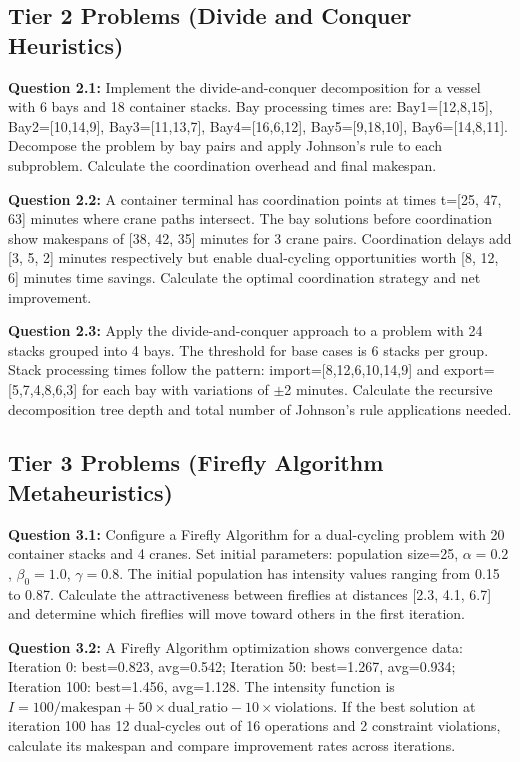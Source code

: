 \documentclass{article}
\begin{document}
\subsection{Tier 2 Problems (Divide and Conquer Heuristics)}

\textbf{Question 2.1:} Implement the divide-and-conquer decomposition for a vessel with 6 bays and 18 container stacks. Bay processing times are: Bay1=[12,8,15], Bay2=[10,14,9], Bay3=[11,13,7], Bay4=[16,6,12], Bay5=[9,18,10], Bay6=[14,8,11]. Decompose the problem by bay pairs and apply Johnson's rule to each subproblem. Calculate the coordination overhead and final makespan.

\textbf{Question 2.2:} A container terminal has coordination points at times t=[25, 47, 63] minutes where crane paths intersect. The bay solutions before coordination show makespans of [38, 42, 35] minutes for 3 crane pairs. Coordination delays add [3, 5, 2] minutes respectively but enable dual-cycling opportunities worth [8, 12, 6] minutes time savings. Calculate the optimal coordination strategy and net improvement.

\textbf{Question 2.3:} Apply the divide-and-conquer approach to a problem with 24 stacks grouped into 4 bays. The threshold for base cases is 6 stacks per group. Stack processing times follow the pattern: import=[8,12,6,10,14,9] and export=[5,7,4,8,6,3] for each bay with variations of $\pm$2 minutes. Calculate the recursive decomposition tree depth and total number of Johnson's rule applications needed.

\subsection{Tier 3 Problems (Firefly Algorithm Metaheuristics)}

\textbf{Question 3.1:} Configure a Firefly Algorithm for a dual-cycling problem with 20 container stacks and 4 cranes. Set initial parameters: population size=25, $\alpha=0.2$, $\beta_0=1.0$, $\gamma=0.8$. The initial population has intensity values ranging from 0.15 to 0.87. Calculate the attractiveness between fireflies at distances [2.3, 4.1, 6.7] and determine which fireflies will move toward others in the first iteration.

\textbf{Question 3.2:} A Firefly Algorithm optimization shows convergence data: Iteration 0: best=0.823, avg=0.542; Iteration 50: best=1.267, avg=0.934; Iteration 100: best=1.456, avg=1.128. The intensity function is $I = 100/\text{makespan} + 50 \times \text{dual\_ratio} - 10 \times \text{violations}$. If the best solution at iteration 100 has 12 dual-cycles out of 16 operations and 2 constraint violations, calculate its makespan and compare improvement rates across iterations.
\end{document}
